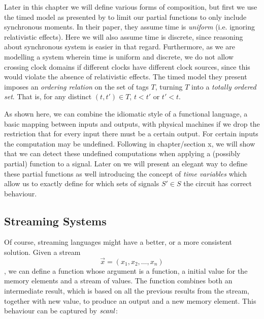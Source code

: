 Later in this chapter we will define various forms of composition, but first we use the timed model as presented by \citeauthor{lee1998framework} to limit our partial functions to only include synchronous moments.
In their paper, they assume time is \textit{uniform} (i.e. ignoring relativistic effects).
Here we will also assume time is discrete, since reasoning about synchronous system is easier in that regard.
Furthermore, as we are modelling a system wherein time is uniform and discrete, we do not allow crossing clock domains if different clocks have different clock sources, since this would violate the absence of relativistic effects.
The timed model they present imposes an \textit{ordering relation} on the set of tags $T$, turning $T$ into a \textit{totally ordered set}.
That is, for any distinct $(t,t') \in T$, $t < t'$ or $t' < t$.

As shown here, we can combine the idiomatic style of a functional language, a basic mapping between inputs and outputs, with physical machines if we drop the restriction that for every input there must be a certain output.
For certain inputs the computation may be undefined. 
Following in chapter/section x, we will show that we can detect these undefined computations when applying a (possibly partial) function to a signal. 
Later on we will present an elegant way to define these partial functions as well introducing the concept of \textit{time variables} which allow us to exactly define for which sets of signals $S' \in S$ the circuit has correct behaviour.

\subsection{Streaming Systems}
Of course, streaming languages might have a better, or a more consistent solution. 
Given a stream \[\vec x = (x_1,x_2,\ldots,x_n)\], we can define a function whose argument is a function, a initial value for the memory elements and a stream of values.
The function combines both an intermediate result, which is based on all the previous results from the stream, together with new value, to produce an output and a new memory element.
This behaviour can be captured by \ensuremath{\Varid{scanl}}:

